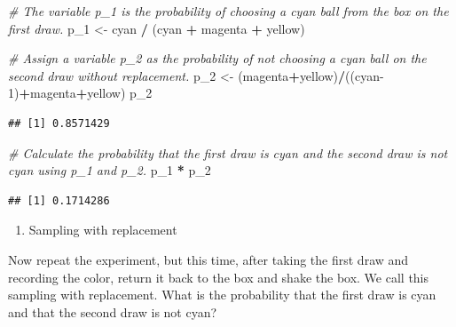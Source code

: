 \documentclass[
]{article}
\newenvironment{Shaded}{\begin{snugshade}}{\end{snugshade}}
\newcommand{\CommentTok}[1]{\textcolor[rgb]{0.56,0.35,0.01}{\textit{#1}}}
\newcommand{\DecValTok}[1]{\textcolor[rgb]{0.00,0.00,0.81}{#1}}
\newcommand{\NormalTok}[1]{#1}
\newcommand{\OperatorTok}[1]{\textcolor[rgb]{0.81,0.36,0.00}{\textbf{#1}}}
\newcommand{\StringTok}[1]{\textcolor[rgb]{0.31,0.60,0.02}{#1}}
\providecommand{\tightlist}{%
  \setlength{\itemsep}{0pt}\setlength{\parskip}{0pt}}
\begin{document}
\begin{Shaded}
\begin{Highlighting}[]
\CommentTok{\# The variable \textasciigrave{}p\_1\textasciigrave{} is the probability of choosing a cyan ball from the box on the first draw.}
\NormalTok{p\_}\DecValTok{1}\NormalTok{ \textless{}{-}}\StringTok{ }\NormalTok{cyan }\OperatorTok{/}\StringTok{ }\NormalTok{(cyan }\OperatorTok{+}\StringTok{ }\NormalTok{magenta }\OperatorTok{+}\StringTok{ }\NormalTok{yellow)}

\CommentTok{\# Assign a variable \textasciigrave{}p\_2\textasciigrave{} as the probability of not choosing a cyan ball on the second draw without replacement.}
\NormalTok{p\_}\DecValTok{2}\NormalTok{ \textless{}{-}}\StringTok{ }\NormalTok{(magenta}\OperatorTok{+}\NormalTok{yellow)}\OperatorTok{/}\NormalTok{((cyan}\DecValTok{{-}1}\NormalTok{)}\OperatorTok{+}\NormalTok{magenta}\OperatorTok{+}\NormalTok{yellow) }
\NormalTok{p\_}\DecValTok{2}
\end{Highlighting}
\end{Shaded}

\begin{verbatim}
## [1] 0.8571429
\end{verbatim}

\begin{Shaded}
\begin{Highlighting}[]
\CommentTok{\# Calculate the probability that the first draw is cyan and the second draw is not cyan using \textasciigrave{}p\_1\textasciigrave{} and \textasciigrave{}p\_2\textasciigrave{}.}
\NormalTok{p\_}\DecValTok{1} \OperatorTok{*}\StringTok{ }\NormalTok{p\_}\DecValTok{2}
\end{Highlighting}
\end{Shaded}

\begin{verbatim}
## [1] 0.1714286
\end{verbatim}

\begin{enumerate}
\def\labelenumi{\arabic{enumi}.}
\setcounter{enumi}{3}
\tightlist
\item
  Sampling with replacement
\end{enumerate}

Now repeat the experiment, but this time, after taking the first draw
and recording the color, return it back to the box and shake the box. We
call this sampling with replacement. What is the probability that the
first draw is cyan and that the second draw is not cyan?
\end{document}
